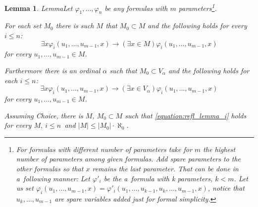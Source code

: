 \documentclass[12pt,a4paper]{article}
\newtheorem{lemma}[theorem]{Lemma}
\newcommand{\then}{\rightarrow}
\newcommand{\bce}{\begin{compactenum}}
\newcommand{\ece}{\end{compactenum}}
\begin{document}
\begin{lemma}{Lemma}\label{lemma:reflection_lemma}
Let $\varphi_1, \ldots, \varphi_n$ be any formulas with $m$ parameters\footnote{For formulas with different number of parameters take for $m$ the highest number of parameters among given formulas. Add spare parameters to the other formulas so that $x$ remains the last parameter. That can be done in a~following manner: Let $\varphi'_i$ be the a~formula with k parameters, $k < m$. Let us set $\varphi_i(u_1, \ldots, u_{m-1}, x) = \varphi'_i(u_1, \ldots, u_{k-1}, u_k, \ldots, u_{m-1}, x)$, notice that $u_k, \ldots, u_{m-1}$ are spare variables added just for formal simplicity.}. 
\bce[(i)]
\item For each set $M_0$ there is such $M$ that $M_0 \subset M$ and the following holds for every $i \leq n$:
\begin{equation}\label{equation:refl_lemma_i}
\exists x \varphi_i(u_1, \ldots, u_{m-1}, x) \then (\exists x \in M) \varphi_i(u_1, \ldots, u_{m-1}, x)
\end{equation}
for every $u_1, \ldots, u_{m-1} \in M$.

\item Furthermore there is an ordinal $\alpha$ such that $M_0 \subset V_\alpha$ and the following holds for each $i \leq n$:
\begin{equation}
\exists x \varphi_i(u_1, \ldots, u_{m-1}, x) \then (\exists x \in V_\alpha) \varphi_i(u_1, \ldots, u_{m-1}, x)
\end{equation}
for every $u_1, \ldots, u_{m-1} \in M$.

\item Assuming \emph{Choice}, there is $M$, $M_0 \subset M$ such that \ref{equation:refl_lemma_i} holds for every $M,\ i \leq n$ and $|M| \leq |M_0| \cdot \aleph_0$.
\ece
\end{lemma}
\end{document}
